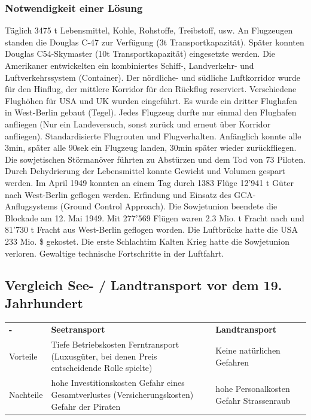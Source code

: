 \documentclass[10pt, openright=true]{scrartcl}
\begin{document}
\subsubsection{Notwendigkeit einer Lösung}
Täglich 3475 t Lebensmittel, Kohle, Rohstoffe, Treibstoff, usw. An Flugzeugen standen die Douglas C-47 zur Verfügung (3t Transportkapazität). Später konnten Douglas C54-Skymaster (10t Transportkapazität) eingesetzte werden. Die Amerikaner entwickelten ein kombiniertes Schiff-, Landverkehr- und Luftverkehrssystem (Container). Der nördliche- und südliche Luftkorridor wurde für den Hinflug, der mittlere Korridor für den Rückflug reserviert. Verschiedene Flughöhen für USA und UK wurden eingeführt. Es wurde ein dritter Flughafen in West-Berlin gebaut (Tegel). Jedes Flugzeug durfte nur einmal den Flughafen anfliegen (Nur ein Landeversuch, sonst zurück und erneut über Korridor anfliegen). Standardisierte Flugrouten und Flugverhalten. Anfänglich konnte alle 3min, später alle 90sek ein Flugzeug landen, 30min später wieder zurückfliegen. Die sowjetischen Störmanöver führten zu Abstürzen und dem Tod von 73 Piloten. Durch Dehydrierung der Lebensmittel konnte Gewicht und Volumen gespart werden.  Im April 1949 konnten an einem Tag durch 1383 Flüge 12’941 t Güter nach West-Berlin geflogen werden. Erfindung und Einsatz des GCA-Anflugsystems (Ground Control Approach). Die Sowjetunion beendete die Blockade am 12. Mai 1949. Mit 277’569 Flügen waren 2.3 Mio. t Fracht nach und 81’730 t Fracht aus West-Berlin geflogen worden.  Die Luftbrücke hatte die USA 233 Mio. \$ gekostet. Die erste \glqq Schlacht\grqq im Kalten Krieg hatte die Sowjetunion verloren. Gewaltige technische Fortschritte in der Luftfahrt.
\subsection{Vergleich See- / Landtransport vor dem 19. Jahrhundert}
\begin{tabularx}{1\textwidth}{L{2cm} L{5cm}  X}
 \textbf{-} & \textbf{Seetransport} & \textbf{Landtransport} \\ 
Vorteile &  Tiefe Betriebskosten \newline Ferntransport (Luxusgüter, bei denen Preis entscheidende Rolle spielte) & Keine natürlichen Gefahren \\
 Nachteile& hohe Investitionskosten \newline Gefahr eines Gesamtverlustes (Versicherungskosten) \newline Gefahr der Piraten & hohe Personalkosten \newline Gefahr Strassenraub\\
\end{tabularx}
\end{document}
